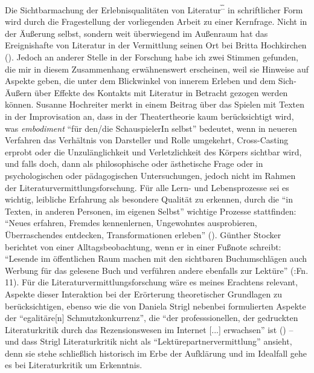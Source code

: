 \documentclass[fontsize=12pt]{scrartcl}
\begin{document}
Die Sichtbarmachung der Erlebnisqualit\"aten von Li\-te\-ra\-tur\textsuperscript{\~.\~.} in schriftlicher Form wird durch die Fragestellung der vorliegenden Arbeit zu einer Kernfrage. Nicht in der \"Au{\ss}erung selbst, sondern weit \"uberwiegend im Au{\ss}enraum hat das Ereignishafte von Li\-te\-ra\-tur in der Ver\-mitt\-lung seinen Ort bei Britta Hochkirchen (\cite{Hochkirchen2015}). Jedoch an an\-de\-rer Stelle in der For\-schung habe ich zwei Stimmen gefunden, die mir in diesem Zusammenhang erw\"ahnenswert erscheinen, weil sie Hinweise auf Aspekte geben, die unter dem Blickwinkel von innerem Erleben und dem Sich-\"Au{\ss}ern \"uber Effekte des Kontakts mit Li\-te\-ra\-tur in Betracht gezogen werden k\"onnen. Susanne Hochreiter merkt in einem Beitrag \"uber das Spielen mit Texten in der Improvisation an, dass in der Theatertheorie kaum ber\"ucksichtigt wird, was \textit{embodiment} "`f\"ur den/die SchauspielerIn \mbox{selbst}"' bedeutet, wenn in neueren Verfahren das Verh\"altnis von Darsteller\textsuperscript{\tiny *} und Rolle umgekehrt, Cross-Casting erprobt oder die Unzul\"ang\-lichkeit und Verletzlichkeit des K\"orpers sichtbar wird, und falls doch, dann als philosophische oder \"asthetische Frage oder in psychologischen oder p\"adagogischen Untersuchungen, jedoch nicht im Rahmen der Li\-te\-ra\-tur\-ver\-mitt\-lungsfor\-schung. F\"ur alle Lern- und Lebensprozesse sei es wichtig, leibliche Erfah\-rung als besondere Qualit\"at zu erkennen, durch die "`in Texten, in anderen Per\-so\-nen, im eigenen Selbst"' wichtige Prozesse stattfinden: "`Neues erfahren, Fremdes kennenlernen, Ungewohntes ausprobieren, \"Uberraschendes entdecken, Transformationen erleben"' (\cite{Hochreiter2012}). G\"unther Stocker berichtet von einer All\-tagsbeobachtung, wenn er in einer Fu{\ss}note schreibt: "`Lesende im \"of\-fent\-lichen Raum machen mit den sichtbaren Buchumschl\"agen auch Werbung f\"ur das gelesene Buch und verf\"uhren andere ebenfalls zur Lekt\"ure"' (\cite{Stocker2012}:Fn. 11). F\"ur die Li\-te\-ra\-tur\-ver\-mitt\-lungsfor\-schung w\"are es meines Erachtens relevant, Aspekte dieser Interaktion bei der Er\-\"or\-te\-rung theo\-retischer Grundlagen zu ber\"ucksichtigen, ebenso wie die von Daniela Strigl nebenbei formulierten Aspekte der "`egalit\"are[n] Schmutzkonkurrenz"', die "`der professsionellen, der gedruckten Li\-te\-ra\-tur\-kritik durch das Rezensionswesen im Internet [...] erwachsen"' ist (\cite{Strigl2012}) -- und dass Strigl Li\-te\-ra\-tur\-kritik nicht als "`Lekt\"urepartnerver\-mitt\-lung"' ansieht, denn sie stehe schlie{\ss}lich historisch im Erbe der Aufkl\"arung und im Idealfall gehe es bei Li\-te\-ra\-tur\-kritik um Erkenntnis.
\end{document}
